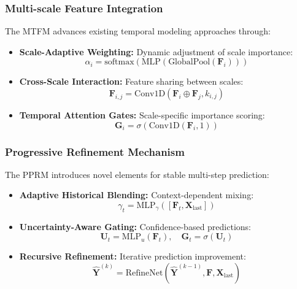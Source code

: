 \documentclass[lettersize, journal]{IEEEtran}
\begin{document}
\subsubsection{Multi-scale Feature Integration}
The MTFM advances existing temporal modeling approaches through:

\begin{itemize}
    \item \textbf{Scale-Adaptive Weighting:} Dynamic adjustment of scale importance:
    \begin{equation}
    \alpha_i = \text{softmax}(\text{MLP}(\text{GlobalPool}(\mathbf{F}_i)))
    \end{equation}
    
    \item \textbf{Cross-Scale Interaction:} Feature sharing between scales:
    \begin{equation}
    \mathbf{F}_{i,j} = \text{Conv1D}(\mathbf{F}_i \oplus \mathbf{F}_j, k_{i,j})
    \end{equation}
    
    \item \textbf{Temporal Attention Gates:} Scale-specific importance scoring:
    \begin{equation}
    \mathbf{G}_i = \sigma(\text{Conv1D}(\mathbf{F}_i, 1))
    \end{equation}
\end{itemize}

\subsubsection{Progressive Refinement Mechanism}
The PPRM introduces novel elements for stable multi-step prediction:

\begin{itemize}
    \item \textbf{Adaptive Historical Blending:} Context-dependent mixing:
    \begin{equation}
    \gamma_t = \text{MLP}_{\gamma}([\mathbf{F}_t, \mathbf{X}_{\text{last}}])
    \end{equation}
    
    \item \textbf{Uncertainty-Aware Gating:} Confidence-based predictions:
    \begin{equation}
    \mathbf{U}_t = \text{MLP}_u(\mathbf{F}_t), \quad \mathbf{G}_t = \sigma(\mathbf{U}_t)
    \end{equation}
    
    \item \textbf{Recursive Refinement:} Iterative prediction improvement:
    \begin{equation}
    \hat{\mathbf{Y}}^{(k)} = \text{RefineNet}(\hat{\mathbf{Y}}^{(k-1)}, \mathbf{F}, \mathbf{X}_{\text{last}})
    \end{equation}
\end{itemize}
\end{document}
